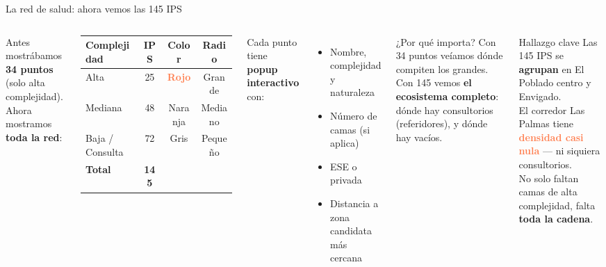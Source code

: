 \documentclass[aspectratio=169, 11pt]{beamer}
\newcommand{\danger}[1]{\textcolor{coral}{\textbf{#1}}}
\begin{document}
\begin{frame}{La red de salud: ahora vemos las 145 IPS}

\begin{columns}[T]
Antes mostrábamos \textbf{34 puntos} (solo alta complejidad).\\
Ahora mostramos \textbf{toda la red}:

\vspace{8pt}
{\small
\begin{tabular}{@{}lccc@{}}
\toprule
\textbf{Complejidad} & \textbf{IPS} & \textbf{Color} & \textbf{Radio} \\
\midrule
\rowcolor{coral!8}
Alta & 25 & \danger{Rojo} & Grande \\
Mediana & 48 & \textcolor{amber}{Naranja} & Mediano \\
Baja / Consulta & 72 & Gris & Pequeño \\
\midrule
\textbf{Total} & \textbf{145} & & \\
\bottomrule
\end{tabular}
}

\vspace{8pt}
Cada punto tiene \textbf{popup interactivo} con:
\begin{itemize}\small
  \item Nombre, complejidad y naturaleza
  \item Número de camas (si aplica)
  \item ESE o privada
  \item Distancia a zona candidata más cercana
\end{itemize}

\begin{alertblock}{\small ¿Por qué importa?}
\footnotesize Con 34 puntos veíamos dónde compiten los grandes.\\
Con 145 vemos \textbf{el ecosistema completo}: dónde hay consultorios (referidores), y dónde hay vacíos.
\end{alertblock}

\vspace{4pt}
\begin{block}{\small Hallazgo clave}
\footnotesize Las 145 IPS se \textbf{agrupan} en El Poblado centro y Envigado.\\[3pt]
El corredor Las Palmas tiene \danger{densidad casi nula} --- ni siquiera consultorios.\\[3pt]
No solo faltan camas de alta complejidad, falta \textbf{toda la cadena}.
\end{block}
\end{columns}
\end{frame}
\end{document}
